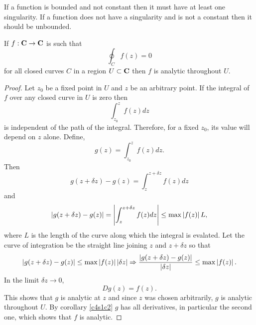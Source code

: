 \begin{rem}
If a function is bounded and not constant then it must have at least one 
singularity. If a function does not have a singularity and is not a constant
then it should be unbounded.
\end{rem}

\begin{thm}\label{c4s2t3}
If $f:\mathbf{C} \rightarrow \mathbf{C}$ is such that 
\[
\oint_C f(z) = 0
\]
for all closed curves $C$ in a region $U \subset \mathbf{C}$ then $f$ is analytic
throughout $U$.
\end{thm}
\begin{proof}
Let $z_0$ be a fixed point in $U$ and $z$ be an arbitrary point. If the integral
of $f$ over any closed curve in $U$ is zero then
\[
\int_{z_0}^z f(z)dz
\]
is independent of the path of the integral. Therefore, for a fixed $z_0$, its
value will depend on $z$ alone. Define,
\[
g(z) = \int_{z_0}^z f(z)dz.
\]
Then
\[
g(z + \delta z) - g(z) = \int_z^{z+\delta z} f(z)dz
\]
and
\[
\left\vert{g(z + \delta z) - g(z)}\right\vert = \left\vert{\int_z^{z+\delta z}f(z)dz}\right\vert \le
\max\left\vert{f(z)}\right\vert L,
\]
where $L$ is the length of the curve along which the integral is evalated. 
Let the curve of integration be the straight line joining $z$ and $z + \delta z$
so that
\[
\left\vert{g(z + \delta z) - g(z)}\right\vert \le \max\left\vert{f(z)}\right\vert\left\vert{\delta z}\right\vert \Rightarrow
\frac{\left\vert{g(z + \delta z) - g(z)}\right\vert}{\left\vert{\delta z}\right\vert} \le \max\left\vert{f(z)}\right\vert.
\]
In the limit $\delta z \rightarrow 0$,
\[
Dg(z) = f(z).
\]
This shows that $g$ is analytic at $z$ and since $z$ was chosen arbitrarily,
$g$ is analytic throughout $U$. By corollary \ref{c4s1c2} $g$ has all 
derivatives, in particular the second one, which shows that $f$ is analytic.
\end{proof}


